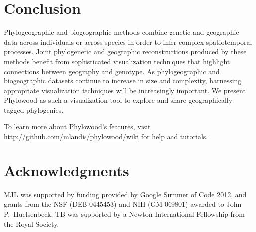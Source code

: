\documentclass[11pt]{article}
\begin{document}
\section{Conclusion}

Phylogeographic and biogeographic methods combine genetic and geographic data across individuals or across species in order to infer complex spatiotemporal processes. Joint phylogenetic and geographic reconstructions produced by these methods benefit from sophisticated visualization techniques that highlight connections between geography and genotype. As phylogeographic and biogeographic datasets continue to increase in size and complexity, harnessing appropriate visualization techniques will be increasingly important. We present Phylowood as such a visualization tool to explore and share geographically-tagged phylogenies. 

To learn more about Phylowood's features, visit \url{http://github.com/mlandis/phylowood/wiki} for help and tutorials.

\section*{Acknowledgments}

MJL was supported by funding provided by Google Summer of Code 2012, and grants from the NSF (DEB-0445453) and NIH (GM-069801) awarded to John P.\ Huelsenbeck.  TB was supported by a Newton International Fellowship from the Royal Society.  



\newpage

\newpage
\end{document}
